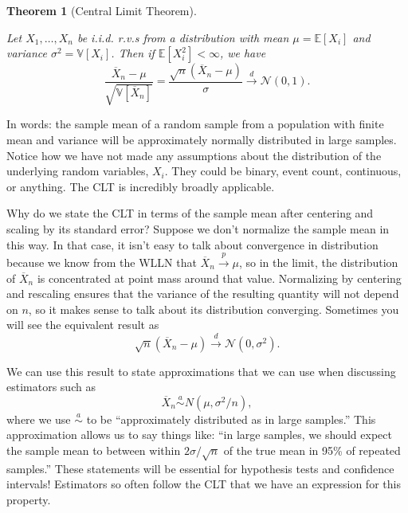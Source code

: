 \documentclass[
  13pt,
  letterpaper,
  DIV=11,
  numbers=noendperiod]{scrreprt}
\newcommand{\E}{\mathbb{E}}
\newcommand{\V}{\mathbb{V}}
\newcommand{\N}{\mathcal{N}}
\newcommand{\Xbar}{\overline{X}}
\newcommand{\inprob}{\overset{p}{\to}}
\newcommand{\indist}{\overset{d}{\to}}
\theoremstyle{plain}
\newtheorem{theorem}{Theorem}[chapter]
\theoremstyle{definition}
\theoremstyle{definition}
\theoremstyle{remark}
\begin{document}
\begin{theorem}[Central Limit
Theorem]\protect\hypertarget{thm-clt}{}\label{thm-clt}

Let \(X_1, \ldots, X_n\) be i.i.d. r.v.s from a distribution with mean
\(\mu = \E[X_i]\) and variance \(\sigma^2 = \V[X_i]\). Then if
\(\E[X_i^2] < \infty\), we have \[
\frac{\Xbar_n - \mu}{\sqrt{\V[\Xbar_n]}} = \frac{\sqrt{n}\left(\Xbar_n - \mu\right)}{\sigma} \indist \N(0, 1).
\]

\end{theorem}

In words: the sample mean of a random sample from a population with
finite mean and variance will be approximately normally distributed in
large samples. Notice how we have not made any assumptions about the
distribution of the underlying random variables, \(X_i\). They could be
binary, event count, continuous, or anything. The CLT is incredibly
broadly applicable.

\begin{tcolorbox}[enhanced jigsaw, title=\textcolor{quarto-callout-note-color}{\faInfo}\hspace{0.5em}{Notation alert}, breakable, colbacktitle=quarto-callout-note-color!10!white, toptitle=1mm, colback=white, arc=.35mm, left=2mm, opacityback=0, titlerule=0mm, colframe=quarto-callout-note-color-frame, leftrule=.75mm, coltitle=black, opacitybacktitle=0.6, bottomtitle=1mm, rightrule=.15mm, bottomrule=.15mm, toprule=.15mm]

Why do we state the CLT in terms of the sample mean after centering and
scaling by its standard error? Suppose we don't normalize the sample
mean in this way. In that case, it isn't easy to talk about convergence
in distribution because we know from the WLLN that
\(\Xbar_n \inprob \mu\), so in the limit, the distribution of
\(\Xbar_n\) is concentrated at point mass around that value. Normalizing
by centering and rescaling ensures that the variance of the resulting
quantity will not depend on \(n\), so it makes sense to talk about its
distribution converging. Sometimes you will see the equivalent result as
\[
\sqrt{n}\left(\Xbar_n - \mu\right) \indist \N(0, \sigma^2).
\]

\end{tcolorbox}

We can use this result to state approximations that we can use when
discussing estimators such as \[
\Xbar_n \overset{a}{\sim} N(\mu, \sigma^2/n),
\] where we use \(\overset{a}{\sim}\) to be ``approximately distributed
as in large samples.'' This approximation allows us to say things like:
``in large samples, we should expect the sample mean to between within
\(2\sigma/\sqrt{n}\) of the true mean in 95\% of repeated samples.''
These statements will be essential for hypothesis tests and confidence
intervals! Estimators so often follow the CLT that we have an expression
for this property.
\end{document}

